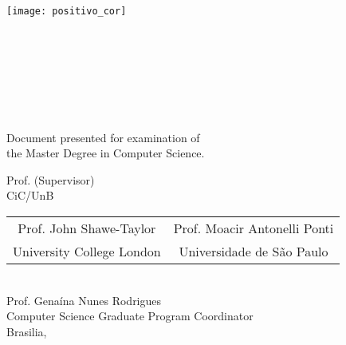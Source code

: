 \begin{titlepage}
	\begin{addmargin}[-0.5cm]{-3cm}
	\begin{center}
			\large
			\bigskip
			\texttt{[image: positivo\_cor]} \\ \medskip
			{\selectfont
					{\huge {\textbf{\myUni}} \\}
					\medskip
					\textbf{\myFaculty} \\
					\textbf{\myDepartment} \\
					 \bigskip
			}

			\hfill

			\vfill

			\begingroup
					\textbf{\spacedallcaps{\myTitle}} \\ \bigskip
			\endgroup

			\spacedlowsmallcaps{\myName}\\ \bigskip

			\vfill
			\small Document presented for examination of \\the Master Degree in Computer Science.
			\vfill

			\vspace{2cm}
				Prof. \mySupervisor (Supervisor)\\
				CiC/UnB\\
				\vspace{2cm}
				\begin{tabular}{ c c }
				  Prof. John Shawe-Taylor & Prof. Moacir Antonelli Ponti \\
				  University College London & Universidade de São Paulo \\
				\end{tabular}\\
				\vspace{2cm}
				Prof. Genaína Nunes Rodrigues\\
				Computer Science Graduate Program Coordinator\\

			\vfill
			Brasilia, \myTime\

			\vfill

	\end{center}
\end{addmargin}
\end{titlepage}
